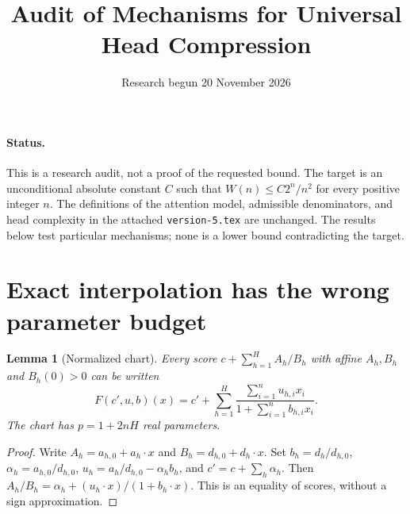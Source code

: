 \documentclass[11pt]{article}
\newtheorem{lemma}[proposition]{Lemma}
\begin{document}
\title{Audit of Mechanisms for Universal Head Compression}
\author{}
\date{Research begun 20 November 2026}
\maketitle

\paragraph{Status.}
This is a research audit, not a proof of the requested bound.
The target is an unconditional absolute constant $C$ such that
$W(n)\le C2^n/n^2$ for every positive integer $n$.
The definitions of the attention model, admissible denominators, and
head complexity in the attached \texttt{version-5.tex} are unchanged.
The results below test particular mechanisms; none is a lower bound
contradicting the target.

\section{Exact interpolation has the wrong parameter budget}

\begin{lemma}[Normalized chart]
Every score $c+\sum_{h=1}^H A_h/B_h$ with affine $A_h,B_h$ and
$B_h(0)>0$ can be written
\[
 F(c',u,b)(x)=c'+\sum_{h=1}^H
       \frac{\sum_{i=1}^n u_{h,i}x_i}{1+\sum_{i=1}^n b_{h,i}x_i}.
\]
The chart has $p=1+2nH$ real parameters.
\end{lemma}
\begin{proof}
Write $A_h=a_{h,0}+a_h\cdot x$ and $B_h=d_{h,0}+d_h\cdot x$.
Set $b_h=d_h/d_{h,0}$, $\alpha_h=a_{h,0}/d_{h,0}$,
$u_h=a_h/d_{h,0}-\alpha_h b_h$, and $c'=c+\sum_h\alpha_h$.
Then $A_h/B_h=\alpha_h+(u_h\cdot x)/(1+b_h\cdot x)$.
This is an equality of scores, without a sign approximation.
\end{proof}
\end{document}
